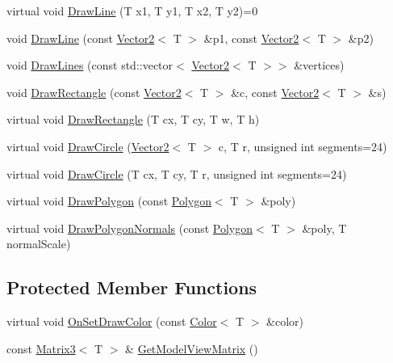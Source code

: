 \begin{DoxyCompactItemize}
virtual void \hyperlink{classastu_1_1suite2d_1_1LineRenderer_ac3bad444d792db789293badda13a47a1}{Draw\+Line} (T x1, T y1, T x2, T y2)=0
\item 
void \hyperlink{classastu_1_1suite2d_1_1LineRenderer_aa302f88389c51e5ab09f6ed3a820060a}{Draw\+Line} (const \hyperlink{classastu_1_1Vector2}{Vector2}$<$ T $>$ \&p1, const \hyperlink{classastu_1_1Vector2}{Vector2}$<$ T $>$ \&p2)
\item 
void \hyperlink{classastu_1_1suite2d_1_1LineRenderer_ac4d0604a79050cb4502f610351c95d75}{Draw\+Lines} (const std\+::vector$<$ \hyperlink{classastu_1_1Vector2}{Vector2}$<$ T $>$$>$ \&vertices)
\item 
void \hyperlink{classastu_1_1suite2d_1_1LineRenderer_aaf99e1a7b37bf3c27e2f1803b77e9126}{Draw\+Rectangle} (const \hyperlink{classastu_1_1Vector2}{Vector2}$<$ T $>$ \&c, const \hyperlink{classastu_1_1Vector2}{Vector2}$<$ T $>$ \&s)
\item 
virtual void \hyperlink{classastu_1_1suite2d_1_1LineRenderer_a2fd6097b1967a2cf1941eee1734f1c4a}{Draw\+Rectangle} (T cx, T cy, T w, T h)
\item 
virtual void \hyperlink{classastu_1_1suite2d_1_1LineRenderer_a9007a92226f871ac2a9afa34b668750d}{Draw\+Circle} (\hyperlink{classastu_1_1Vector2}{Vector2}$<$ T $>$ c, T r, unsigned int segments=24)
\item 
virtual void \hyperlink{classastu_1_1suite2d_1_1LineRenderer_a8a5f7f51a0f8d370687474f51a10ff00}{Draw\+Circle} (T cx, T cy, T r, unsigned int segments=24)
\item 
virtual void \hyperlink{classastu_1_1suite2d_1_1LineRenderer_a3f05efe889a3d7705071139c142d54ad}{Draw\+Polygon} (const \hyperlink{classastu_1_1Polygon}{Polygon}$<$ T $>$ \&poly)
\item 
virtual void \hyperlink{classastu_1_1suite2d_1_1LineRenderer_ac77778c3e9f3f405d0552e585511c361}{Draw\+Polygon\+Normals} (const \hyperlink{classastu_1_1Polygon}{Polygon}$<$ T $>$ \&poly, T normal\+Scale)
\end{DoxyCompactItemize}
\subsection*{Protected Member Functions}
\begin{DoxyCompactItemize}
\item 
virtual void \hyperlink{classastu_1_1suite2d_1_1LineRenderer_a8571273df1940b8d2059e88abc7e4d5a}{On\+Set\+Draw\+Color} (const \hyperlink{classastu_1_1Color}{Color}$<$ T $>$ \&color)
\item 
const \hyperlink{classastu_1_1Matrix3}{Matrix3}$<$ T $>$ \& \hyperlink{classastu_1_1suite2d_1_1LineRenderer_a7e69f2a618bd4b471236cefc153f54e6}{Get\+Model\+View\+Matrix} ()
\end{DoxyCompactItemize}


